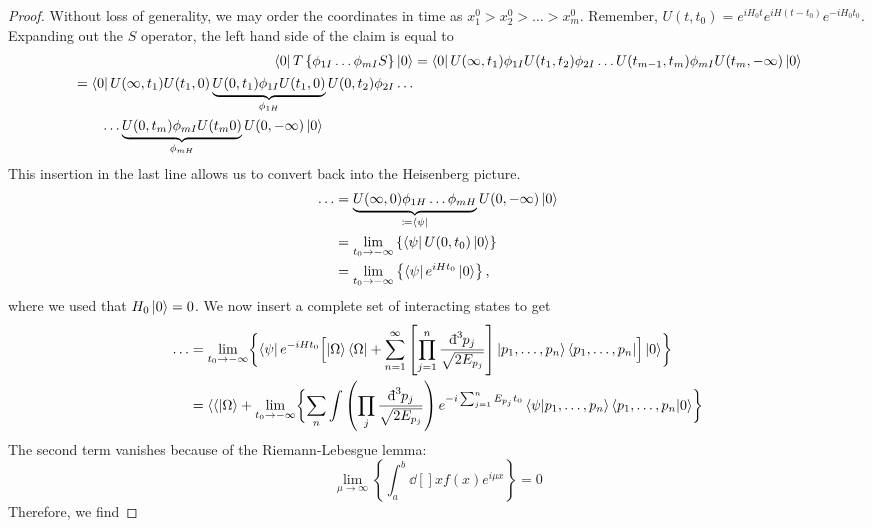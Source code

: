 \begin{proof}
  Without loss of generality, we may order the coordinates in time as $x_1^0 > x_2^0 > \dots > x_m^0$.
  Remember, $U(t, t_0) = e^{iH_0 t} e^{iH(t - t_0)} e^{-i H_0 t_0}$.
  Expanding out the $S$ operator, the left hand side of the claim is equal to
  \begin{align}
    \bra{0} T \left\{ \phi_{1I} \dots \phi_{mI} S \right\} \ket{0} &=
    \bra{0} U(\infty, t_1) \phi_{1I} U(t_1, t_2) \phi_{2I} \dots U(t_{m-1}, t_m) \phi_{mI} U(t_m, -\infty) \ket{0} \\
    \begin{split}
      &= \bra{0} U(\infty, t_1) U(t_1, 0) \underbrace{U(0, t_1) \phi_{1I} U(t_1, 0)}_{\phi_{1H}} U(0, t_2) \phi_{2I} \dots \\
      & \qquad \dots \underbrace{U(0, t_m) \phi_{mI} U(t_m 0)}_{\phi_{mH}} U(0, -\infty) \ket{0}
    \end{split}
  \end{align}
  This insertion in the last line allows us to convert back into the Heisenberg picture.
  \begin{align}
    \dots &= \underbrace{U(\infty, 0) \phi_{1H} \dots \phi_{mH}}_{\coloneqq \bra{\psi}} U(0, -\infty) \ket{0} \\
	  &= \lim_{t_0 \to -\infty} \left\{ \bra{\psi} U(0, t_0) \ket{0} \right\} \\
	  &= \lim_{t_0 \to -\infty} \left\{ \bra{\psi} e^{i H t_0} \ket{0} \right\},
  \end{align}
  where we used that $H_0 \ket{0} = 0$. We now insert a complete set of interacting states to get
  \begin{align}
    \dots &= \lim_{t_0 \to - \infty} \biggl\{ \bra{\psi} e^{-i Ht_0} \Bigl[ \ket{\Omega} \bra{\Omega} + \sum_{n=1}^\infty \left[ \prod_{j=1}^n \frac{\bdd[3]{p_j}}{\sqrt{2E_{p_j}}} \right] \ket{p_1, \dots, p_n} \bra{p_1, \dots, p_n} \Bigr] \ket{0} \biggr\}  \\
	  &= \bra{\langle} \ket{\Omega} + \lim_{t_0 \to -\infty} \biggl\{ \sum_n \int \left( \prod_j \frac{\bdd[3]{p_j}}{\sqrt{2E_{p_j}}} \right) e^{-i \sum_{j=1}^n E_{p_j} t_0} \bra{\psi} \ket{p_1, \dots, p_n}\bra{p_1, \dots, p_n} \ket{0} \biggr\}
  \end{align}
  The second term vanishes because of the Riemann-Lebesgue lemma:
  \begin{equation}
    \lim_{\mu \to \infty} \left\{ \int_{a}^{b}  \dd[]{x} f(x) e^{i\mu x} \right\} = 0
  \end{equation}
  Therefore, we find 

\end{proof}
